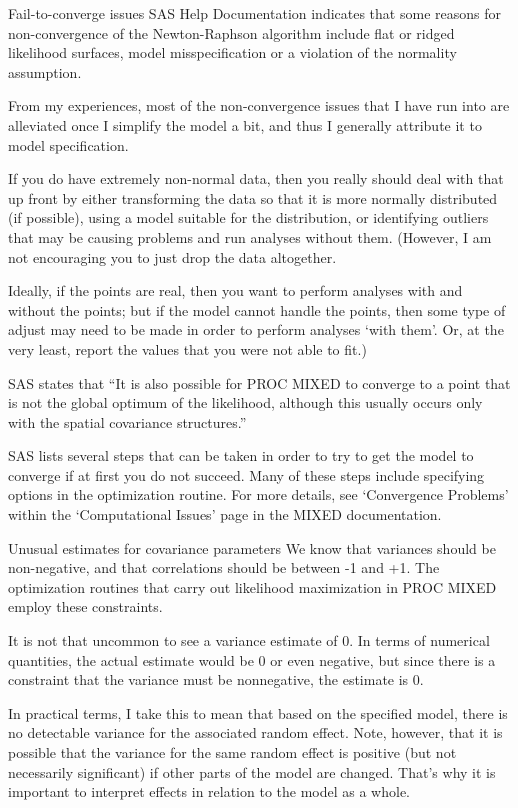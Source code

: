 \documentclass[
  9pt,
  ignorenonframetext,
]{beamer}
\begin{document}
\begin{frame}{Fail-to-converge issues}
\protect\hypertarget{fail-to-converge-issues}{}
SAS Help Documentation indicates that some reasons for non-convergence
of the Newton-Raphson algorithm include flat or ridged likelihood
surfaces, model misspecification or a violation of the normality
assumption.

From my experiences, most of the non-convergence issues that I have run
into are alleviated once I simplify the model a bit, and thus I
generally attribute it to model specification.

If you do have extremely non-normal data, then you really should deal
with that up front by either transforming the data so that it is more
normally distributed (if possible), using a model suitable for the
distribution, or identifying outliers that may be causing problems and
run analyses without them. (However, I am not encouraging you to just
drop the data altogether.
\end{frame}

\begin{frame}{}
\protect\hypertarget{section-5}{}
Ideally, if the points are real, then you want to perform analyses with
and without the points; but if the model cannot handle the points, then
some type of adjust may need to be made in order to perform analyses
`with them'. Or, at the very least, report the values that you were not
able to fit.)

SAS states that ``It is also possible for PROC MIXED to converge to a
point that is not the global optimum of the likelihood, although this
usually occurs only with the spatial covariance structures.''

SAS lists several steps that can be taken in order to try to get the
model to converge if at first you do not succeed. Many of these steps
include specifying options in the optimization routine. For more
details, see `Convergence Problems' within the `Computational Issues'
page in the MIXED documentation.
\end{frame}

\begin{frame}{Unusual estimates for covariance parameters}
\protect\hypertarget{unusual-estimates-for-covariance-parameters}{}
We know that variances should be non-negative, and that correlations
should be between -1 and +1. The optimization routines that carry out
likelihood maximization in PROC MIXED employ these constraints.

It is not that uncommon to see a variance estimate of 0. In terms of
numerical quantities, the actual estimate would be 0 or even negative,
but since there is a constraint that the variance must be nonnegative,
the estimate is 0.

In practical terms, I take this to mean that based on the specified
model, there is no detectable variance for the associated random effect.
Note, however, that it is possible that the variance for the same random
effect is positive (but not necessarily significant) if other parts of
the model are changed. That's why it is important to interpret effects
in relation to the model as a whole.
\end{frame}
\end{document}
